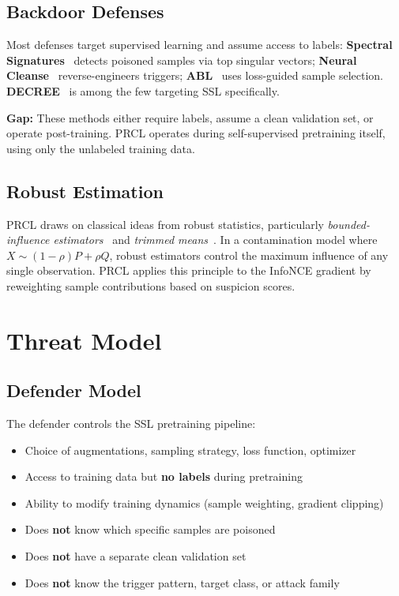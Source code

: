 \documentclass[11pt,a4paper]{article}
\begin{document}
\subsection{Backdoor Defenses}

Most defenses target supervised learning and assume access to labels:
\textbf{Spectral Signatures}~\cite{tran2018spectral} detects poisoned samples
via top singular vectors;
\textbf{Neural Cleanse}~\cite{wang2019neural} reverse-engineers triggers;
\textbf{ABL}~\cite{li2021anti} uses loss-guided sample selection.
\textbf{DECREE}~\cite{zhang2023decree} is among the few targeting SSL
specifically.

\textbf{Gap:} These methods either require labels, assume a clean validation
set, or operate post-training.  PRCL operates during self-supervised pretraining
itself, using only the unlabeled training data.

\subsection{Robust Estimation}

PRCL draws on classical ideas from robust statistics, particularly
\emph{bounded-influence estimators}~\cite{hampel1986robust} and \emph{trimmed
means}~\cite{tukey1960survey}.  In a contamination model where
$X\sim(1-\rho)P+\rho Q$, robust estimators control the maximum influence of any
single observation.  PRCL applies this principle to the InfoNCE gradient by
reweighting sample contributions based on suspicion scores.


\section{Threat Model}
\label{sec:threat}

\subsection{Defender Model}

The defender controls the SSL pretraining pipeline:
\begin{itemize}[nosep]
  \item Choice of augmentations, sampling strategy, loss function, optimizer
  \item Access to training data but \textbf{no labels} during pretraining
  \item Ability to modify training dynamics (sample weighting, gradient clipping)
  \item Does \textbf{not} know which specific samples are poisoned
  \item Does \textbf{not} have a separate clean validation set
  \item Does \textbf{not} know the trigger pattern, target class, or attack family
\end{itemize}
\end{document}
